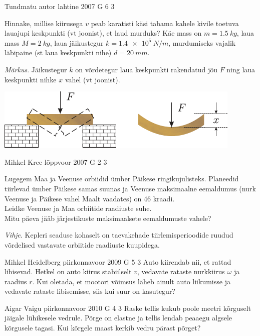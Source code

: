 \documentclass[11pt]{article}
\begin{document}
{%
{Tundmatu autor} %
{lahtine} %
{2007} %
{G 6} %
{3} %
{
\ifStatement
Hinnake, millise kiirusega $v$ peab karatisti käsi tabama kahele kivile toetuva lauajupi keskpunkti (vt joonist), et laud murduks? Käe mass on $m = \SI{1,5}{kg}$, laua mass $M = \SI{2}{kg}$, laua jäikustegur $k = \SI{1,4e5}{N/m}$, murdumiseks vajalik läbipaine (st laua keskpunkti nihe) $d = \SI{20}{mm}$. 

\emph{Märkus}. Jäikustegur $k$ on võrdetegur laua keskpunkti rakendatud jõu $F$ ning laua keskpunkti nihke $x$ vahel (vt joonist).

\begin{center}
	\includegraphics[width=0.8\linewidth]{2007-lahg-06-yl}
\end{center}
\fi
}

{Mihkel Kree} %
{lõppvoor} %
{2007} %
{G 2} %
{3} %
{
\ifStatement
Lugegem Maa ja Veenuse orbiidid ümber Päikese ringikujulisteks. Planeedid tiirlevad ümber Päikese samas suunas ja Veenuse maksimaalne eemaldumus (nurk Veenuse ja Päikese vahel Maalt vaadates) on 46 kraadi.\\
\osa Leidke Veenuse ja Maa orbiitide raadiuste suhe.\\
\osa Mitu päeva jääb järjestikuste maksimaalsete eemaldumuste vahele?

\emph{Vihje}. Kepleri seaduse kohaselt on taevakehade tiirlemisperioodide ruudud võrdelised vastavate orbiitide raadiuste kuupidega.
\fi
}

{Mihkel Heidelberg} %
{piirkonnavoor} %
{2009} %
{G 5} %
{3} %
{
\ifStatement
Auto kiirendab nii, et rattad libisevad. Hetkel on auto kiirus stabiilselt $v$, vedavate rataste nurkkiirus $\omega$ ja raadius $r$. Kui oletada, et mootori võimsus läheb ainult auto liikumisse ja vedavate rataste libisemisse, siis kui suur on kasutegur?
\fi
}

{Aigar Vaigu} %
{piirkonnavoor} %
{2010} %
{G 4} %
{3} %
{
\ifStatement
Raske tellis kukub poole meetri kõrguselt jäigale lühikesele vedrule. Põrge
on elastne ja tellis lendab peaaegu algsele kõrgusele tagasi. Kui
kõrgele maast kerkib vedru pärast põrget?
\fi
}

}
\end{document}
